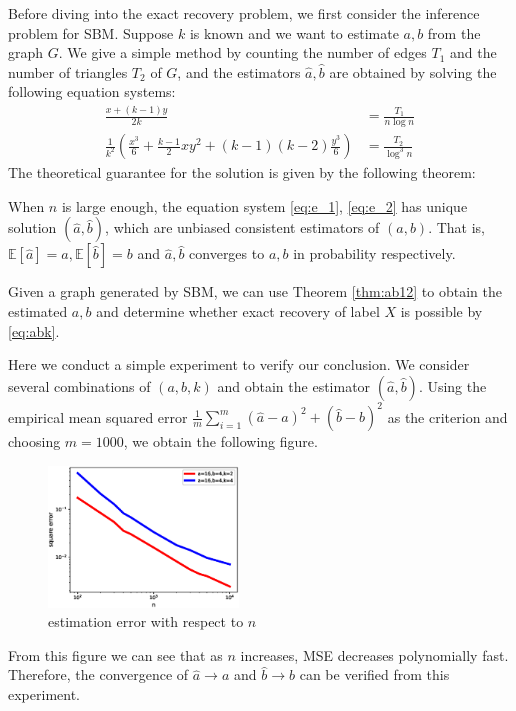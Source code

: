 \documentclass[entropy,article,submit,moreauthors,pdftex]{Definitions/mdpi}
\newcommand{\1}{\mathbbm{1}}
\begin{document}
Before diving into the exact recovery problem, we first consider the inference problem for SBM.
Suppose $k$ is known and we want to estimate $a,b$ from the graph $G$.
We give a simple method
by counting the number of edges $T_1$ and the number of triangles $T_2$ of $G$, and the estimators $\hat{a}, \hat{b}$ are
obtained by solving the following equation systems:
\begin{align}
\frac{x+(k-1)y}{2k} & = \frac{T_1}{n\log n} \label{eq:e_1}\\
\frac{1}{k^2}
\left(\frac{x^3}{6} + \frac{k-1}{2}xy^2 + (k-1)(k-2)\frac{y^3}{6}\right) & = \frac{T_2}{\log^3 n} \label{eq:e_2}
\end{align}
The theoretical guarantee for the solution is given by the following theorem:
\begin{Theorem}\label{thm:ab12}
When $n$ is large enough, the equation system \eqref{eq:e_1}, \eqref{eq:e_2} has unique solution $(\hat{a}, \hat{b})$,
which are unbiased consistent estimators
of $(a,b)$. That is,
$\mathbb{E}[\hat{a}] = a, \mathbb{E}[\hat{b}] = b$ and $\hat{a}, \hat{b}$ converges to $a,b$ in probability respectively.
\end{Theorem}
Given a graph generated by SBM, we can use Theorem \ref{thm:ab12} to obtain the estimated $a,b$ and determine whether
exact recovery of label $X$ is possible by \eqref{eq:abk}.

Here we conduct a simple experiment to verify our conclusion.
We consider several combinations of $(a,b,k)$ and obtain the estimator $(\hat{a}, \hat{b})$. Using
the empirical mean squared error $\frac{1}{m} \sum_{i=1}^m (\hat{a}-a)^2 + (\hat{b}-b)^2$ as the criterion
and choosing $m=1000$, we obtain the following figure.
\begin{figure}[!ht]
	\centering
	\includegraphics[width=0.45\textwidth]{estimator-error-2020-11-22.eps}
	\caption{estimation error with respect to $n$}
\end{figure}
From this figure we can see that as $n$ increases, MSE decreases polynomially fast. Therefore, the convergence
of $\hat{a} \to a$ and $\hat{b} \to b$ can be verified from this experiment.
\end{document}
